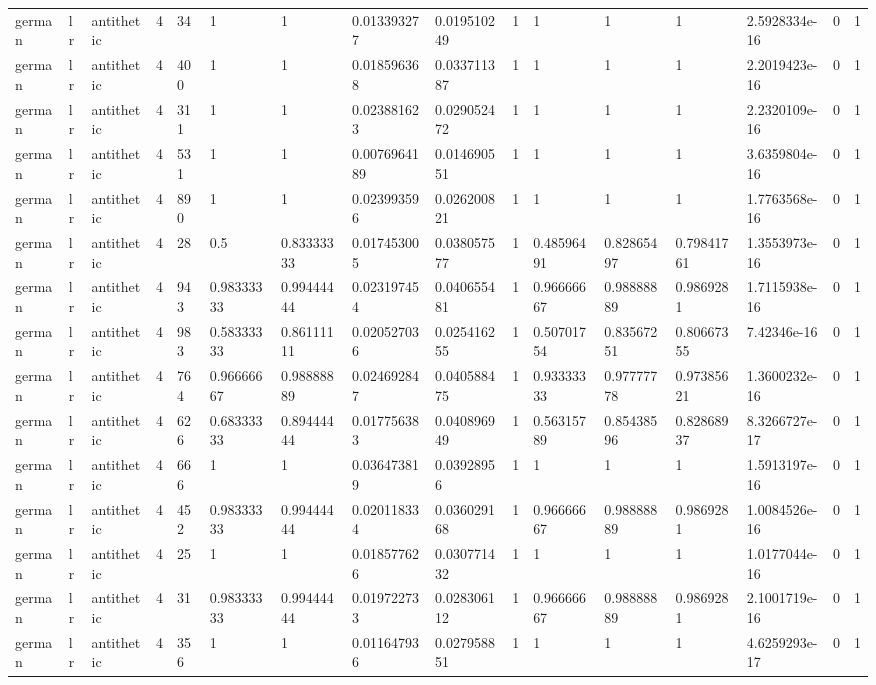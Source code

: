 \begin{tabular}{llllllllllllllll}
german & lr & antithetic & 4 & 34 & 1 & 1 & 0.013393277 & 0.019510249 & 1 & 1 & 1 & 1 & 2.5928334e-16 & 0 & 1 \\
german & lr & antithetic & 4 & 400 & 1 & 1 & 0.018596368 & 0.033711387 & 1 & 1 & 1 & 1 & 2.2019423e-16 & 0 & 1 \\
german & lr & antithetic & 4 & 311 & 1 & 1 & 0.023881623 & 0.029052472 & 1 & 1 & 1 & 1 & 2.2320109e-16 & 0 & 1 \\
german & lr & antithetic & 4 & 531 & 1 & 1 & 0.0076964189 & 0.014690551 & 1 & 1 & 1 & 1 & 3.6359804e-16 & 0 & 1 \\
german & lr & antithetic & 4 & 890 & 1 & 1 & 0.023993596 & 0.026200821 & 1 & 1 & 1 & 1 & 1.7763568e-16 & 0 & 1 \\
german & lr & antithetic & 4 & 28 & 0.5 & 0.83333333 & 0.017453005 & 0.038057577 & 1 & 0.48596491 & 0.82865497 & 0.79841761 & 1.3553973e-16 & 0 & 1 \\
german & lr & antithetic & 4 & 943 & 0.98333333 & 0.99444444 & 0.023197454 & 0.040655481 & 1 & 0.96666667 & 0.98888889 & 0.9869281 & 1.7115938e-16 & 0 & 1 \\
german & lr & antithetic & 4 & 983 & 0.58333333 & 0.86111111 & 0.020527036 & 0.025416255 & 1 & 0.50701754 & 0.83567251 & 0.80667355 & 7.42346e-16 & 0 & 1 \\
german & lr & antithetic & 4 & 764 & 0.96666667 & 0.98888889 & 0.024692847 & 0.040588475 & 1 & 0.93333333 & 0.97777778 & 0.97385621 & 1.3600232e-16 & 0 & 1 \\
german & lr & antithetic & 4 & 626 & 0.68333333 & 0.89444444 & 0.017756383 & 0.040896949 & 1 & 0.56315789 & 0.85438596 & 0.82868937 & 8.3266727e-17 & 0 & 1 \\
german & lr & antithetic & 4 & 666 & 1 & 1 & 0.036473819 & 0.03928956 & 1 & 1 & 1 & 1 & 1.5913197e-16 & 0 & 1 \\
german & lr & antithetic & 4 & 452 & 0.98333333 & 0.99444444 & 0.020118334 & 0.036029168 & 1 & 0.96666667 & 0.98888889 & 0.9869281 & 1.0084526e-16 & 0 & 1 \\
german & lr & antithetic & 4 & 25 & 1 & 1 & 0.018577626 & 0.030771432 & 1 & 1 & 1 & 1 & 1.0177044e-16 & 0 & 1 \\
german & lr & antithetic & 4 & 31 & 0.98333333 & 0.99444444 & 0.019722733 & 0.028306112 & 1 & 0.96666667 & 0.98888889 & 0.9869281 & 2.1001719e-16 & 0 & 1 \\
german & lr & antithetic & 4 & 356 & 1 & 1 & 0.011647936 & 0.027958851 & 1 & 1 & 1 & 1 & 4.6259293e-17 & 0 & 1 \\

\end{tabular}
